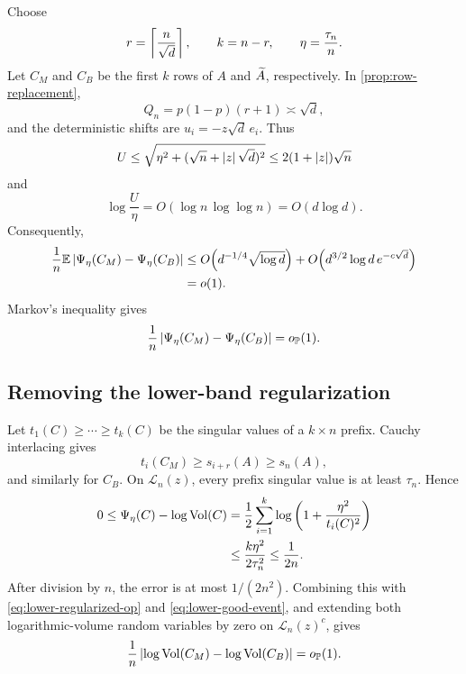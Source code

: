 Choose
\begin{equation}\label{eq:lower-prefix-parameters}
  r=\left\lceil \frac n{\sqrt d}\right\rceil,
  \qquad
  k=n-r,
  \qquad
  \eta=\frac{\tau_n}{n}.
\end{equation}
Let $C_M$ and $C_B$ be the first $k$ rows of $A$ and $\widetilde A$, respectively. In \cref{prop:row-replacement},
\[
  Q_n=p(1-p)(r+1)\asymp\sqrt d,
\]
and the deterministic shifts are $u_i=-z\sqrt d\,e_i$. Thus
\[
  U\le\sqrt{\eta^2+(\sqrt n+\left|z\right|\sqrt d)^2}\le2(1+\left|z\right|)\sqrt n
\]
and
\begin{equation}\label{eq:lower-U-over-eta}
  \log\frac U\eta=O(\log n\,\log\log n)=O(d\log d).
\end{equation}
Consequently,
\begin{align}
  \frac1n\mathbb E\left|\Psi_\eta(C_M)-\Psi_\eta(C_B)\right|
  &\le O\!\left(d^{-1/4}\sqrt{\log d}\right)
  +O\!\left(d^{3/2}\log d\,e^{-c\sqrt d}\right)
  \notag\\
  &=o(1).
  \label{eq:lower-regularized-comparison}
\end{align}
Markov's inequality gives
\begin{equation}\label{eq:lower-regularized-op}
  \frac1n\left|\Psi_\eta(C_M)-\Psi_\eta(C_B)\right|=o_{\mathbb P}(1).
\end{equation}

\subsection{Removing the lower-band regularization}

Let $t_1(C)\ge\cdots\ge t_k(C)$ be the singular values of a $k\times n$ prefix. Cauchy interlacing gives
\[
  t_i(C_M)\ge s_{i+r}(A)\ge s_n(A),
\]
and similarly for $C_B$. On $\mathcal L_n(z)$, every prefix singular value is at least $\tau_n$. Hence
\begin{align*}
  0\le\Psi_\eta(C)-\log\operatorname{Vol}(C)
  &=\frac12\sum_{i=1}^k\log\left(1+\frac{\eta^2}{t_i(C)^2}\right)\\
  &\le\frac{k\eta^2}{2\tau_n^2}
  \le\frac1{2n}.
\end{align*}
After division by $n$, the error is at most $1/(2n^2)$. Combining this with
\eqref{eq:lower-regularized-op} and \eqref{eq:lower-good-event}, and extending both logarithmic-volume random variables by zero on $\mathcal L_n(z)^c$, gives
\begin{equation}\label{eq:lower-prefix-volume-comparison}
  \frac1n\left|\log\operatorname{Vol}(C_M)-\log\operatorname{Vol}(C_B)\right|=o_{\mathbb P}(1).
\end{equation}

